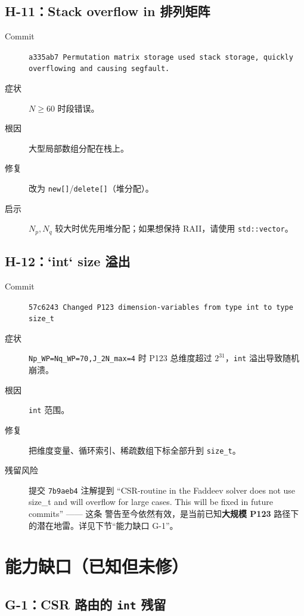 \subsection{H-11：Stack overflow in 排列矩阵}

\begin{description}
  \item[Commit] \texttt{a335ab7 Permutation matrix storage used stack storage, quickly overflowing and causing segfault.}
  \item[症状] \(N\ge 60\) 时段错误。
  \item[根因] 大型局部数组分配在栈上。
  \item[修复] 改为 \texttt{new[]}/\texttt{delete[]}（堆分配）。
  \item[启示] \(N_p,N_q\) 较大时优先用堆分配；如果想保持 RAII，请使用 \texttt{std::vector}。
\end{description}

\subsection{H-12：`int` size 溢出}

\begin{description}
  \item[Commit] \texttt{57c6243 Changed P123 dimension-variables from type int to type size\_t}
  \item[症状] \texttt{Np\_WP=Nq\_WP=70,J\_2N\_max=4} 时 P123 总维度超过 \(2^{31}\)，\texttt{int} 溢出导致随机崩溃。
  \item[根因] \texttt{int} 范围。
  \item[修复] 把维度变量、循环索引、稀疏数组下标全部升到 \texttt{size\_t}。
  \item[残留风险] 提交 \texttt{7b9aeb4} 注解提到 “CSR-routine in the Faddeev solver does not use size\_t and will overflow for large cases. This will be fixed in future commits” —— 这条
        警告至今依然有效，是当前已知\textbf{大规模 P123} 路径下的潜在地雷。详见下节“能力缺口 G-1”。
\end{description}

\section{能力缺口（已知但未修）}
\label{sec:appF_known_gaps}

\subsection{G-1：CSR 路由的 \texttt{int} 残留}

